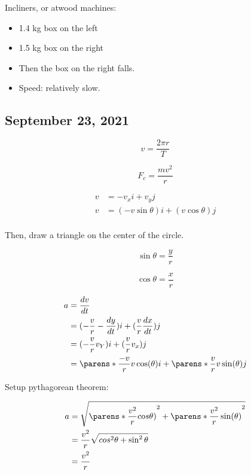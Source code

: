 \documentclass{scrreprt} %
\begin{document}
Incliners, or atwood machines:

\begin{itemize}
	\item 1.4 kg box on the left
	\item 1.5 kg box on the right
	\item Then the box on the right falls.
	\item Speed: relatively slow.
\end{itemize}

\subsection{September 23, 2021}

\begin{theorem}
	$$v = \frac{2\pi r}{T}$$
\end{theorem}

\begin{theorem}

$$F_c = \frac{mv^2}{r}$$

\begin{align*}
	v &= -v_xi + v_yj \\ 
	v &= (-v\sin \theta)i + (v\cos \theta)j \\
\end{align*}

Then, draw a triangle on the center of the circle.

$$\sin \theta = \frac{y}{r}$$

$$\cos \theta = \frac{x}{r}$$

\begin{align*}
	a &= \frac{dv}{dt} \\
	  &= (-\frac{v}{r} - \frac{dy}{dt})i + (\frac{v}{r} \frac{dx}{dt})j \\
	  &= (-\frac{v}{r}v_Y)i + (\frac{v}{r}v_x)j \\
	  &= \parens*{\frac{-v}{r}v\cos(\theta)}i + \parens*{\frac{v}{r}v\sin(\theta)}j
\end{align*}

Setup pythagorean theorem:

\begin{align*}
	a &= \sqrt{\parens*{\frac{v^2}{r}cos\theta)}^2 + \parens*{\frac{v^2}{r}\sin(\theta)}^2} \\
	  &= \frac{v^2}{r} \sqrt{cos^2 \theta + \sin^2 \theta} \\
	  &= \frac{v^2}{r}
\end{align*}
	
\end{theorem}
\end{document}
